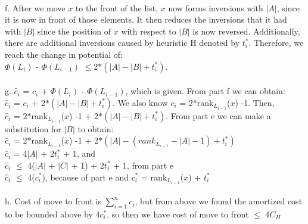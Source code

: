 \documentclass[]{report}
\begin{document}
\begin{enumerate}
	\\
	f. After we move $ x $ to the front of the list, $ x $ now  forms inversions with $ |A| $, since it is now in front of those elements. It then reduces the inversions that it had with $ |B| $ since the position of $ x $ with respect to $ |B| $ is now reversed. Additionally, there are additional inversions caused by heuristic H denoted by $ t_{i}^{*} $. Therefore, we reach the change in potential of: \\ $ \Phi(L_{i}) $ - $ \Phi(L_{i-1})$ $ \leq $2$*(|A| - |B| + t_{i}^{*})$.
	\\
	\\
	g. 	$ \hat{c}_{i} $ = $ c_{i} $ + $ \Phi(L_{i}) $  - $ \Phi(L_{i-1})$, which is given. From part f we can obtain:
	\\ $ \hat{c}_{i} $ = $ c_{i} $ + 2$*(|A| - |B| + t_{i}^{*})$. We also know $ c_{i} $ = 2$*$rank$_{L_{i-1}}$($ x $) -1. Then, \\
	 $ \hat{c}_{i} $ = 2$*$rank$_{L_{i-1}}$($ x $) -1 + 2$*(|A| - |B| + t_{i}^{*})$. From part e we can make a substitution for $ |B| $ to obtain: \\
	 $ \hat{c}_{i} $ = 2$*$rank$_{L_{i-1}}$($ x $) -1 + 2$*(|A| - (rank_{L_{i-1}} - |A| -1) + t_{i}^{*})$ \\
	 $ \hat{c}_{i} $ = 4$ |A| $ + 2$  t_{i}^{*} $ + 1, and \\
	 $ \hat{c}_{i} $ $ \leq $ 4($ |A| $ + $ |C| $ + 1) + 2$  t_{i}^{*} $ + 1, from part e \\ 
	 $ \hat{c}_{i} $ $ \leq $ 4($ c_{i}^{*} $), because of part e and $ c_{i}^{*} $ = rank$_{L_{i-1}} $($ x $) + $ t_{i}^{*} $
	\\
	\\
	h. Cost of move to front is $\sum_{i=1}^{n}$$ c_{i} $, but from above we found the amortized cost to be bounded above by 4$ c_{i}^{*} $, so then we have cost of move to front $ \leq $ 4$ C_{H} $
	\\
	\\
	
\end{enumerate}
\end{document}
